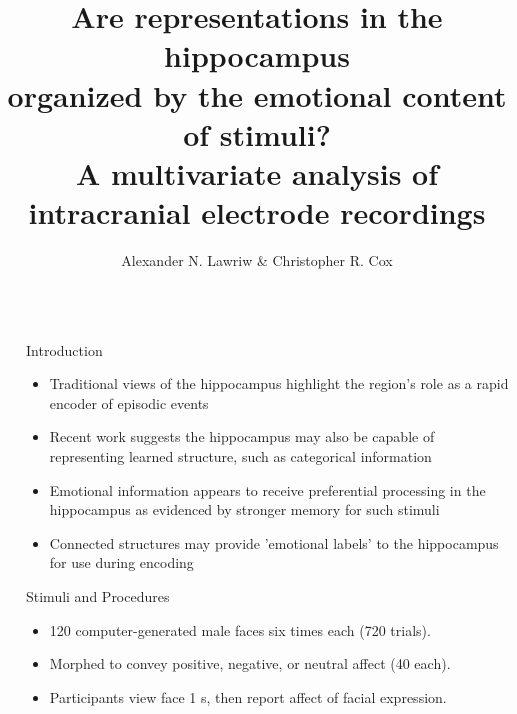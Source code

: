 \documentclass[final,20pt]{beamer}
\title{Are representations in the hippocampus\\organized by the emotional content of stimuli? \\ A multivariate analysis of intracranial electrode recordings}
\author{Alexander N. Lawriw \& Christopher R. Cox}
\institute[shortinst]{\textit{Louisiana State University, Baton Rouge, LA}}
\newlength{\sepwidth}
\newlength{\colwidth}
\newlength{\colwidthsmall}
\newcommand{\separatorcolumn}{\begin{column}{\sepwidth}\end{column}}
\begin{document}

\begin{frame}[t]
\begin{columns}[t]
\separatorcolumn

\begin{column}{\colwidthsmall}

  \begin{block}{Introduction}

    \begin{itemize}
      \item Traditional views of the hippocampus highlight the region's role as a rapid encoder of episodic events \cite{mcclelland_why_1995}
      \item Recent work suggests the hippocampus may also be capable of representing learned structure, such as categorical information \cite{schapiro_human_2018}
      \item Emotional information appears to receive preferential processing in the hippocampus as evidenced by stronger memory for such stimuli \cite{dolcos_interaction_2004}
      \item Connected structures may provide 'emotional labels' to the hippocampus for use during encoding \cite{rolls_hippocampus_2022} 
      
    \end{itemize}
  \end{block}



  \begin{block}{Stimuli and Procedures}
      
    \begin{itemize}
        \item 120 computer-generated male faces six times each (720 trials).
        \item Morphed to convey positive, negative, or neutral affect (40 each).
        \item Participants view face  1 s, then report affect of facial expression.
    \end{itemize}
    

\end{block}
\end{column}
\end{columns}
\end{frame}
\end{document}
